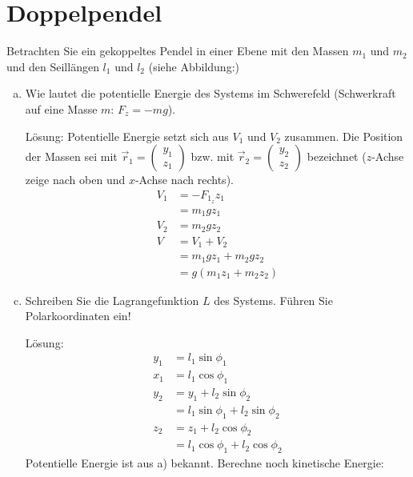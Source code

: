 \documentclass{scrartcl}
\newcommand{\vecz}[2]{\begin{pmatrix}#1 \\ #2\end{pmatrix}}
\begin{document}
\section{Doppelpendel}
Betrachten Sie ein gekoppeltes Pendel in einer Ebene mit den Massen $m_1$ und $m_2$ und den Seillängen $l_1$ und $l_2$ (siehe Abbildung:)
\begin{figure}
\end{figure}

\begin{enumerate}[a)]
\item Wie lautet die potentielle Energie des Systems im Schwerefeld (Schwerkraft auf eine Masse $m$: $F_z = -mg$).
\item[Lösung:] Potentielle Energie setzt sich aus $V_1$ und $V_2$ zusammen. Die Position der Massen sei mit $\vec r_1=\vecz{y_1}{z_1}$ bzw. mit $\vec r_2=\vecz{y_2}{z_2}$ bezeichnet ($z$-Achse zeige nach oben und $x$-Achse nach rechts).
\begin{align*}
V_1 &= -F_{1_z}z_1 \\
	&= m_1gz_1	\\
V_2 &= m_2gz_2 \\
V	&= V_1+V_2	\\
	&= m_1gz_1 + m_2gz_2\\
	&= g(m_1z_1 + m_2z_2)
\end{align*}

\item Schreiben Sie die Lagrangefunktion $L$ des Systems. Führen Sie Polarkoordinaten ein!
\item[Lösung:]
\begin{align*}
y_1 	&= l_1 \sin \phi_1	\\
x_1 	&= l_1 \cos \phi_1	\\
y_2		&= y_1 + l_2 \sin \phi_2	\\
		&= l_1 \sin \phi_1 + l_2 \sin \phi_2	\\
z_2		&= z_1 + l_2 \cos \phi_2	\\
		&= l_1 \cos \phi_1 + l_2 \cos \phi_2 
\end{align*}
Potentielle Energie ist aus a) bekannt. Berechne noch kinetische Energie:

\end{enumerate}
\end{document}
